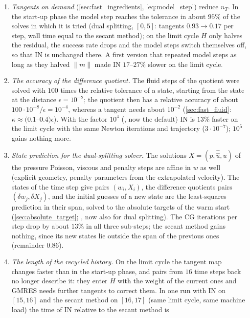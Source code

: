 \documentclass[11pt,a4paper]{article}
\theoremstyle{definition}
\theoremstyle{remark}
\begin{document}
\begin{enumerate}
\item \emph{Tangents on demand} (\cref{sec:fast_ingredients}, \eqref{eq:model_step}) reduce $n_T$.
In the start-up phase the model step reaches the tolerance in about $95\%$ of the solves in which it
is tried (dual splitting, $[0,5]$: tangents $0.93\to0.17$ per step, wall time equal to the secant
method); on the limit cycle $H$ only halves the residual, the success rate drops and the model steps
switch themselves off, so that IN is unchanged there. A first version that repeated model steps as
long as they halved $\|m\|$ made IN $17$--$27\%$ slower on the limit cycle.
\item \emph{The accuracy of the difference quotient.} The fluid steps of the quotient were solved
with $100$ times the relative tolerance of a state, starting from the state at the distance
$\epsilon=10^{-2}$; the quotient then has a relative accuracy of about $100\cdot10^{-8}/\epsilon=10^{-4}$,
whereas a tangent needs about $10^{-2}$ (\cref{sec:fast_fluid}: $\kappa\approx(0.1$--$0.4)\epsilon$). With the factor
$10^4$ (, now the default) IN is $13\%$ faster on the limit
cycle with the same Newton iterations and trajectory ($3\cdot10^{-7}$); $10^5$ gains nothing more.
\item \emph{State prediction for the dual-splitting solver.} The solutions $X=(p,\hat{\hat u},u)$ of
the pressure Poisson, viscous and penalty steps are affine in $w$ as well (explicit geometry, penalty
parameters from the extrapolated velocity). The states of the time step give pairs $(w_i,X_i)$, the
difference quotients pairs $(\delta w_j,\delta X_j)$, and the initial guesses of a new state are
the least-squares prediction in their span, solved to the absolute targets of the warm start
(\cref{sec:absolute_target}; , now also for dual splitting). The CG
iterations per step drop by about $13\%$ in all three sub-steps; the secant method gains nothing,
since its new states lie outside the span of the previous ones (remainder $0.86$).
\item \emph{The length of the recycled history.} On the limit cycle the tangent map changes
faster than in the start-up phase, and pairs from $16$ time steps back no longer describe it: they
enter $H$ with the weight of the current ones and GMRES needs further tangents to correct them. In
one run with IN on $[15,16]$ and the secant method on $[16,17]$ (same limit cycle, same machine
load) the time of IN relative to the secant method is

\end{enumerate}
\end{document}
